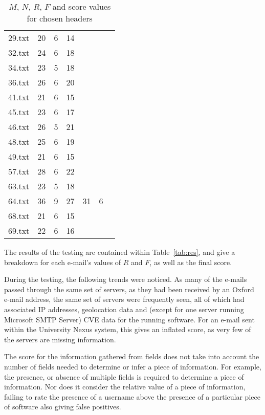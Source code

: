 \begin{table}[]
\begin{tabular}{@{}lccclll@{}}
29.txt & 20           & 6                     & 14   &     &     &     \\
32.txt & 24           & 6                     & 18   &     &     &     \\
34.txt & 23           & 5                     & 18   &     &     &     \\
36.txt & 26           & 6                     & 20   &     &     &     \\
41.txt & 21           & 6                     & 15   &     &     &     \\
45.txt & 23           & 6                     & 17   &     &     &     \\
46.txt & 26           & 5                     & 21   &     &     &     \\
48.txt & 25           & 6                     & 19   &     &     &     \\
49.txt & 21           & 6                     & 15   &     &     &     \\
57.txt & 28           & 6                     & 22   &     &     &     \\
63.txt & 23           & 5                     & 18   &     &     &     \\
64.txt & 36           & 9                     & 27   & 31  & 6   &     \\
68.txt & 21           & 6                     & 15   &     &     &     \\
69.txt & 22           & 6                     & 16   &     &     &     \\ \bottomrule
\end{tabular}
\caption{$M$, $N$, $R$, $F$ and score values for chosen headers}
\label{tab:sammn}
\end{table}

The results of the testing are contained within Table~\ref{tab:res}, and give a
breakdown for each e-mail's values of $R$ and $F$, as well as the final score.

During the testing, the following trends were noticed.  As many of the e-mails
passed through the same set of servers, as they had been received by an Oxford
e-mail address, the same set of servers were frequently seen, all of which had
associated IP addresses, geolocation data and (except for one server running
Microsoft SMTP Server) CVE data for the running software.  For an e-mail sent
within the University Nexus system, this gives an inflated score, as very few
of the servers are missing information.

The score for the information gathered from fields does not take into account
the number of fields needed to determine or infer a piece of information. For
example, the presence, or absence of multiple fields is required to determine a
piece of information.  Nor does it consider the relative value of a piece of
information, failing to rate the presence of a username above the presence of a
particular piece of software also giving false positives.

